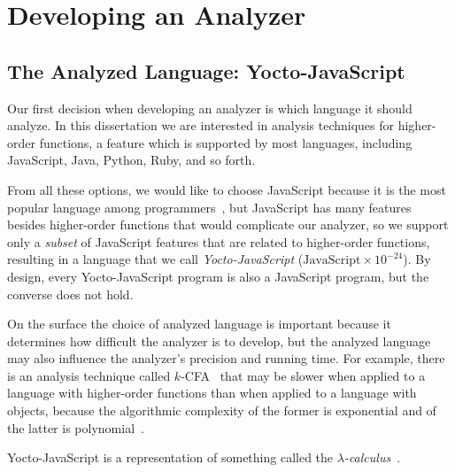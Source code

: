 \documentclass[12pt, oneside]{book}
\begin{document}
\tableofcontents

\mainmatter


\chapter{Developing an Analyzer}


\section{The Analyzed Language: Yocto-JavaScript}
\label{The Analyzed Language: Yocto-JavaScript}

Our first decision when developing an analyzer is which language it should analyze. In this dissertation we are interested in analysis techniques for higher-order functions, a feature which is supported by most languages, including JavaScript, Java, Python, Ruby, and so forth.

From all these options, we would like to choose JavaScript because it is the most popular language among programmers~\cite{stack-overflow-developer-survey, jet-brains-developer-survey}, but JavaScript has many features besides higher-order functions that would complicate our analyzer, so we support only a \emph{subset} of JavaScript features that are related to higher-order functions, resulting in a language that we call \emph{Yocto-JavaScript} ($\mathrm{JavaScript} \times 10^{-24}$). By design, every Yocto-JavaScript program is also a JavaScript program, but the converse does not hold.

\begin{mdframed}[frametitle = {Advanced}]
On the surface the choice of analyzed language is important because it determines how difficult the analyzer is to develop, but the analyzed language may also influence the analyzer’s precision and running time. For example, there is an analysis technique called $k$-CFA~\cite{k-cfa} that may be slower when applied to a language with higher-order functions than when applied to a language with objects, because the algorithmic complexity of the former is exponential and of the latter is polynomial~\cite{m-cfa}.
\end{mdframed}

\begin{mdframed}[frametitle = {Technical Terms}]
Yocto-JavaScript is a representation of something called the \emph{$\lambda$-calculus}~\cite[§~6]{understanding-computation}.
\end{mdframed}
\end{document}
